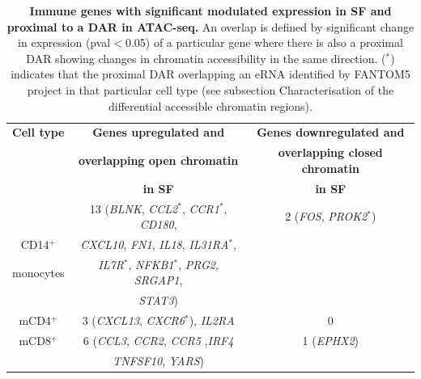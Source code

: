 \begin{table}[htbp]
\centering
\begin{tabular}{@{} c c c}
\toprule
\textbf{Cell type} & \textbf{Genes upregulated and}        &  \textbf{Genes downregulated and} \\
                   & \textbf{overlapping open chromatin}   &  \textbf{overlapping closed chromatin} \\
									 &	\textbf{in SF}				               &  \textbf{in SF} \\
\midrule
\midrule
          & 13 (\textit{BLNK}, \textit{CCL2$^\ast$}, \textit{CCR1$^\ast$}, \textit{CD180}, & 2 (\textit{FOS}, \textit{PROK2$^\ast$}) \\      CD14$^+$  & \textit{CXCL10}, \textit{FN1}, \textit{IL18}, \textit{IL31RA$^\ast$},    & \\
monocytes & \textit{IL7R$^\ast$}, \textit{NFKB1$^\ast$}, \textit{PRG2}, \textit{SRGAP1}, & \\
				  & \textit{STAT3}) & \\
				
\midrule
mCD4$^+$ & 3 (\textit{CXCL13}, \textit{CXCR6$^\ast$}), \textit{IL2RA}& 0 \\

\midrule
mCD8$^+$ & 6 (\textit{CCL3}, \textit{CCR2}, \textit{CCR5} ,\textit{IRF4} & 1 (\textit{EPHX2}) \\
         & \textit{TNFSF10}, \textit{YARS}) & \\

\bottomrule
\end{tabular}
\medskip %
\caption[Immune genes with significant modulated expression in SF and proximal to a DAR in ATAC-seq.]{\textbf{Immune genes with significant modulated expression in SF and proximal to a DAR in ATAC-seq.} An overlap is defined by significant change in expression (pval$<$0.05) of a particular gene where there is also a proximal DAR showing changes in chromatin accessibility in the same direction. ($^\ast$) indicates that the proximal DAR overlapping an eRNA identified by FANTOM5 project in that particular cell type (see subsection Characterisation of the differential accessible chromatin regions).}
\label{tab:PSA_gene_expression_ATAC_overlap}
\end{table}

